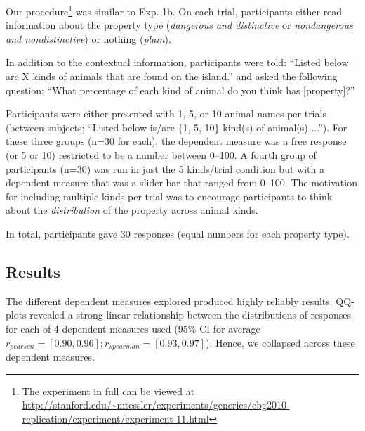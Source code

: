 \documentclass[10pt,letterpaper]{article}
\begin{document}
Our procedure\footnote{The experiment in full can be viewed at \url{http://stanford.edu/~mtessler/experiments/generics/cbg2010-replication/experiment/experiment-11.html}} was similar to Exp. 1b. On each trial, participants either read information about the property type (\emph{dangerous and distinctive} or \emph{nondangerous and nondistinctive}) or nothing (\emph{plain}). 

In addition to the contextual information, participants were told: ``Listed below are X kinds of animals that are found on the island.'' and asked the following question: ``What percentage of each kind of animal do you think has [property]?'' 

Participants were either presented with 1, 5, or 10 animal-names per trials (between-subjects; ``Listed below is/are \{1, 5, 10\} kind(s) of animal(s) ...''). For these three groups (n=30 for each), the dependent measure was a free response (or 5 or 10) restricted to be a number between 0--100. A fourth group of participants (n=30) was run in just the 5 kinds/trial condition but with a dependent measure that was a slider bar that ranged from 0--100. The motivation for including multiple kinds per trial was to encourage participants to think about the \emph{distribution} of the property across animal kinds.

In total, participants gave 30 responses (equal numbers for each property type).

\subsection{Results}

The different dependent measures explored produced highly reliably results. QQ-plots revealed a strong linear relationship between the distributions of responses for each of 4 dependent measures used (95\% CI for average $r_{pearson} = [0.90,0.96]; r_{spearman}= [0.93,0.97]$). Hence, we collapsed across these dependent measures.
\end{document}
